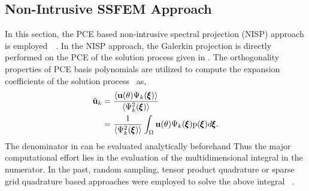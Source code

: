 \documentclass[letter,1p,11pt,oneside,onecolumn,sort&compress]{elsarticle}
\begin{document}
\subsection{Non-Intrusive SSFEM Approach} \label{sec:NI}
In this section, the PCE based non-intrusive spectral projection (NISP) approach is employed~~\cite{le2010spectral,reagana2003uncertainty,hosder2006non}.
In the NISP approach, the Galerkin projection is directly performed on the PCE of the solution process given in . The orthogonality properties of PCE basis polynomials are utilized to compute the expansion coefficients of the solution process~\cite{ghanemSFEM1991,le2010spectral} as,
\begin{align}\label{eq:NISPpce}
{\mathrm{\hat{\bf{u}}}_k}   &= \frac{\left< {\mathrm{\bf{u}(\theta)}} {\Psi_k({\pmb{\xi}})}  \right>} {\left<{\Psi_k^2({\pmb{\xi}})}  \right>} \\ \nonumber &= \frac{1} {\left<{\Psi_k^2({\pmb{\xi}})}  \right>} \int_{\Omega} {\mathrm{\bf{u}(\theta)}} {\Psi_k({\pmb{\xi}})} {\mathrm{p}}({\pmb{\xi}}) {d{\pmb{\xi}}}.
\end{align}
The denominator in  can be evaluated analytically beforehand
Thus the major computational effort lies in the evaluation of the multidimensional integral in the numerator. In the past, random sampling, tensor product quadrature or sparse grid quadrature based approaches were employed to solve the above integral
~\cite{le2010spectral,reagana2003uncertainty,hosder2006non,ganapathysubramanian2007sparse,nobile2008sparse}.
\end{document}
